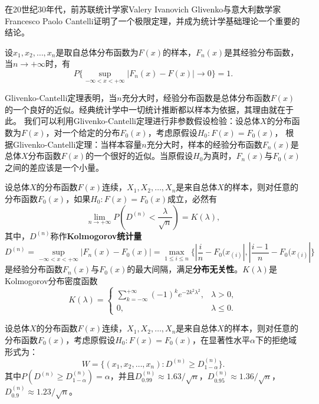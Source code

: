 在20世纪30年代，前苏联统计学家Valery Ivanovich Glivenko与意大利数学家Francesco Paolo Cantelli证明了一个极限定理，并成为统计学基础理论一个重要的结论。
\begin{theorem}
设$x_1,x_2,\ldots, x_n$是取自总体分布函数为$F(x)$的样本，$F_n(x)$是其经验分布函数，当$n\rightarrow +\infty$时，有
\[
    P\{\sup\limits_{-\infty<x<+\infty} |F_n(x) - F(x)| \rightarrow 0\} = 1.
\]
\end{theorem}
Glivenko-Cantelli定理表明，当$n$充分大时，经验分布函数是总体分布函数$F(x)$的一个良好的近似。经典统计学中一切统计推断都以样本为依据，其理由就在于此。
我们可以利用Glivenko-Cantelli定理进行非参数假设检验：设总体$X$的分布函数为$F(x)$，对一个给定的分布$F_0(x)$，考虑原假设$H_0: F(x) = F_0(x)$，
根据Glivenko-Cantelli定理：当样本容量$n$充分大时，样本的经验分布函数$F_n(x)$是总体$X$分布函数$F(x)$的一个很好的近似。当原假设$H_0$为真时，$F_n(x)$与$F_0(x)$之间的差应该是一个小量。

\begin{theorem}
设总体$X$的分布函数$F(x)$连续，$X_1,X_2,\ldots, X_n$是来自总体$X$的样本，则对任意的分布函数$F_0(x)$，如果$H_0:F(x)=F_0(x)$成立，必然有
\begin{equation}
    \lim\limits_{n\rightarrow +\infty} P(D^{(n)} < \frac{\lambda}{\sqrt n}) = K(\lambda),
\end{equation}
其中，$D^{(n)}$称作\textbf{Kolmogorov统计量}
\begin{equation}
    D^{(n)} = \sup\limits_{-\infty<x<+\infty} |F_n(x) - F_0(x)| = \max\limits_{1\le i\le n} \big\{|\frac{i}{n} - F_0(x_{(i)}|,|\frac{i-1}{n} - F_0(x_{(i)}|\big\}
\end{equation}
是经验分布函数$F_n(x)$与$F_0(x)$的最大间隔，满足\textbf{分布无关性}。$K(\lambda)$是Kolmogorov分布密度函数
\begin{equation}
    K(\lambda) =\left\{
    \begin{array}{rl}
    \sum\limits_{k=-\infty}^{+\infty} (-1)^k e^{-2k^2\lambda^2}, & \lambda > 0,\\
    0, & \lambda \le 0.
    \end{array}
    \right.
\end{equation}
\end{theorem}

\begin{definition}
设总体$X$的分布函数$F(x)$连续，$X_1,X_2,\ldots, X_n$是来自总体$X$的样本，则对任意的分布函数$F_0(x)$，考虑原假设$H_0:F(x)=F_0(x)$，在显著性水平$\alpha$下的拒绝域形式为：
\[
    W = \{(x_1,x_2,\ldots, x_n): D^{(n)} \ge D_{1-\alpha}^{(n)}\}.
\]
其中$P(D^{(n)} \ge D_{1-\alpha}^{(n)}) = \alpha$，并且$D_{0.99}^{(n)} \approx 1.63/\sqrt n$，$D_{0.95}^{(n)} \approx 1.36/\sqrt n$，$D_{0.9}^{(n)} \approx 1.23/\sqrt n$。
\end{definition}

